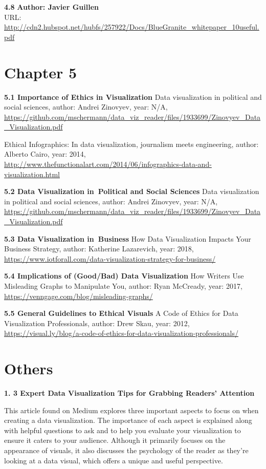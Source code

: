 \documentclass[]{book}
\theoremstyle{definition}
\theoremstyle{definition}
\theoremstyle{definition}
\theoremstyle{remark}
\begin{document}
\textbf{4.8} \textbf{Author: Javier Guillen}\\
URL:
\url{http://cdn2.hubspot.net/hubfs/257922/Docs/BlueGranite_whitepaper_10useful.pdf}

\section{Chapter 5}\label{chapter-5}

\textbf{5.1 Importance of Ethics in Visualization} Data visualization in
political and social sciences, author: Andrei Zinovyev, year: N/A,
\url{https://github.com/mschermann/data_viz_reader/files/1933699/Zinovyev_Data_Visualization.pdf}

Ethical Infographics: In data visualization, journalism meets
engineering, author: Alberto Cairo, year: 2014,
\url{http://www.thefunctionalart.com/2014/06/infographics-data-and-visualization.html}

\textbf{5.2 Data Visualization in~Political and Social Sciences} Data
visualization in political and social sciences, author: Andrei Zinovyev,
year: N/A,
\url{https://github.com/mschermann/data_viz_reader/files/1933699/Zinovyev_Data_Visualization.pdf}

\textbf{5.3 Data Visualization in~Business} How Data Visualization
Impacts Your Business Strategy, author: Katherine Lazarevich, year:
2018,
\url{https://www.iotforall.com/data-visualization-strategy-for-business/}

\textbf{5.4 Implications of (Good/Bad) Data Visualization} How Writers
Use Misleading Graphs to Manipulate You, author: Ryan McCready, year:
2017, \url{https://venngage.com/blog/misleading-graphs/}

\textbf{5.5 General Guidelines to Ethical Visuals} A Code of Ethics for
Data Visualization Professionals, author: Drew Skau, year: 2012,
\url{https://visual.ly/blog/a-code-of-ethics-for-data-visualization-professionals/}

\section{Others}\label{others}

\textbf{1. 3 Expert Data Visualization Tips for Grabbing Readers'
Attention} \citep{attention_grabbers}

This article found on Medium explores three important aspects to focus
on when creating a data visualization. The importance of each aspect is
explained along with helpful questions to ask and to help you evaluate
your visualization to ensure it caters to your audience. Although it
primarily focuses on the appearance of visuals, it also discusses the
psychology of the reader as they're looking at a data visual, which
offers a unique and useful perspective.
\end{document}
